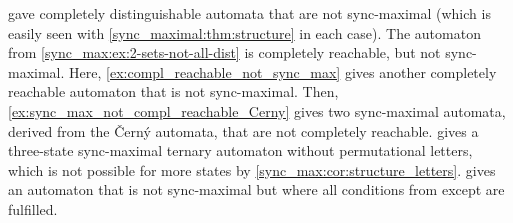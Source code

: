 

gave completely distinguishable automata that are not sync-maximal (which is easily seen with \cref{sync_maximal:thm:structure} 
in each case).
The automaton from \cref{sync_max:ex:2-sets-not-all-dist} 
is completely reachable, but not sync-maximal.
Here, \cref{ex:compl_reachable_not_sync_max} 
gives another completely reachable automaton that is not sync-maximal.
Then, \cref{ex:sync_max_not_compl_reachable_Cerny} gives two sync-maximal automata, derived from the \v{C}ern\'y automata,
that are not completely reachable.
 gives a three-state sync-maximal ternary automaton
without permutational letters, which is not possible
for more states by \cref{sync_max:cor:structure_letters}.
 gives an automaton that is not
sync-maximal but where all conditions from  except  
are fulfilled. 




